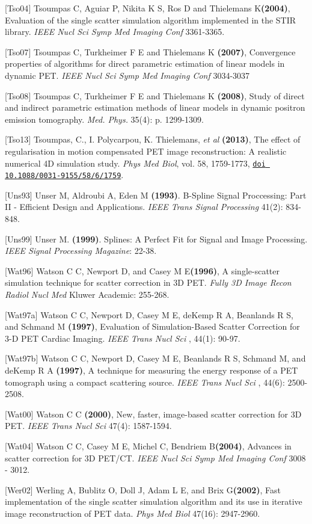 \documentclass{article}
\def\R2Lurl#1#2{\mbox{\href{#1}{\tt #2}}}
\begin{document}
{[}Tso04{]} Tsoumpas C, Aguiar P, Nikita K S, Ros D and Thielemans K\textbf{(2004)}, 
Evaluation of the single scatter simulation algorithm implemented in the STIR library. 
\textit { IEEE Nucl Sci Symp Med Imaging Conf } 3361-3365.

{[}Tso07{]} Tsoumpas C, Turkheimer F E and Thielemans K  \textbf{(2007)}, 
Convergence properties of algorithms for direct parametric estimation of linear models in dynamic PET. 
\textit{IEEE Nucl Sci Symp Med Imaging Conf} 3034-3037

{[}Tso08{]} Tsoumpas C, Turkheimer F E and Thielemans K \textbf{(2008)}, Study of direct and indirect 
parametric estimation methods of linear models in dynamic positron emission tomography. \textit{Med. Phys.} 
35(4): p. 1299-1309.

[Tso13] Tsoumpas, C., I.
Polycarpou, K. Thielemans, \textit{et al} \textbf{(2013)}, The effect of
regularisation in motion compensated PET image reconstruction: A realistic
numerical 4D simulation study. \textit{Phys Med Biol}, vol. 58, 1759-1773, 
\R2Lurl{http://dx.doi.org/10.1088/0031-9155/58/6/1759}{doi 10.1088/0031-9155/58/6/1759}.


{[}Uns93] Unser M, Aldroubi A, Eden M \textbf{(1993)}. B-Spline Signal Proccessing: Part II - Efficient Design and Applications.  \textit{IEEE Trans Signal Processing} 41(2): 834-848.

{[}Uns99] Unser M. \textbf{(1999)}. Splines: A Perfect Fit for Signal and Image Processing. \textit{IEEE Signal Processing Magazine}: 22-38.

{[}Wat96{]} Watson C C, Newport D, and Casey M E\textbf{(1996)}, 
A single-scatter simulation technique for scatter correction in 3D PET. 
\textit { Fully 3D Image Recon Radiol Nucl Med} Kluwer Academic: 255-268. 

{[}Wat97a{]} Watson C C, Newport D, Casey M E, deKemp R A, Beanlands R S, and Schmand M 
\textbf{(1997)}, Evaluation of Simulation-Based Scatter Correction for 3-D PET Cardiac Imaging. 
\textit { IEEE Trans Nucl Sci }, 44(1): 90-97.

{[}Wat97b{]} Watson C C, Newport D, Casey M E, Beanlands R S, Schmand M, and deKemp R A 
\textbf{(1997)}, A technique for measuring the energy response of a PET tomograph using a compact scattering source. 
\textit { IEEE Trans Nucl Sci }, 44(6): 2500-2508.

{[}Wat00{]} Watson C C \textbf{(2000)}, New, faster, image-based scatter correction for 3D PET. 
\textit { IEEE Trans Nucl Sci } 47(4): 1587-1594. 

{[}Wat04{]} Watson C C, Casey M E, Michel C, Bendriem B\textbf{(2004)}, 
Advances in scatter correction for 3D PET/CT. \textit { IEEE Nucl Sci Symp Med Imaging Conf } 3008 - 3012. 

{[}Wer02{]} Werling A, Bublitz O, Doll J, Adam L E, and Brix G\textbf{(2002)}, 
Fast implementation of the single scatter simulation algorithm and its use in iterative image 
reconstruction of PET data. \textit { Phys Med Biol } 47(16): 2947-2960.
\end{document}
